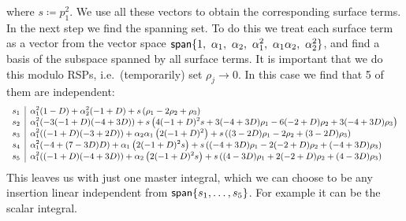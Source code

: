 where $s\coloneqq p_1^2$.
We use all these vectors to obtain the corresponding surface terms. 
In the next step we find the spanning set.
To do this we treat each surface term as a vector from the vector space 
$\mathsf{span}\{1,~ \alpha_1,~ \alpha_2,~\alpha_1^2,~\alpha_1\alpha_2,~\alpha_2^2\}$,
and find a basis of the subspace spanned by all surface terms. 
It is important that we do this modulo RSPs, i.e.\ (temporarily) set $\rho_j\to 0$.
In this case we find that 5 of them are independent:
\begin{equation*}
  \small
  \begin{array}{l|l}
    s_1 & \alpha _1^2 (1-D)+\alpha _2^2 (-1+D)+s \left(\rho _1-2 \rho _2+\rho _3\right) \\
    s_2 & \alpha _1^2 (-3 (-1+D) (-4+3 D))+s \left(4 (-1+D)^2 s+3 (-4+3 D) \rho _1-6 (-2+D) \rho _2+3 (-4+3 D) \rho _3\right) \\
    s_3 & \alpha _1^2 ((-1+D) (-3+2 D))+\alpha _2 \alpha _1 \left(2 (-1+D)^2\right)+s \left((3-2 D) \rho _1-2 \rho _2+(3-2 D) \rho _3\right) \\
    s_4 & \alpha _1^2 (-4+(7-3 D) D)+\alpha _1 \left(2 (-1+D)^2 s\right)+s \left((-4+3 D) \rho _1-2 (-2+D) \rho _2+(-4+3 D) \rho _3\right) \\
    s_5 & \alpha _1^2 ((-1+D) (-4+3 D))+\alpha _2 \left(2 (-1+D)^2 s\right)+s \left((4-3 D) \rho _1+2 (-2+D) \rho _2+(4-3 D) \rho _3\right) \\
  \end{array}
\end{equation*}
This leaves us with just one master integral, which
we can choose to be any insertion linear independent from $\mathsf{span}\{s_1,\ldots{},s_5\}$.
For example it can be the scalar integral.








